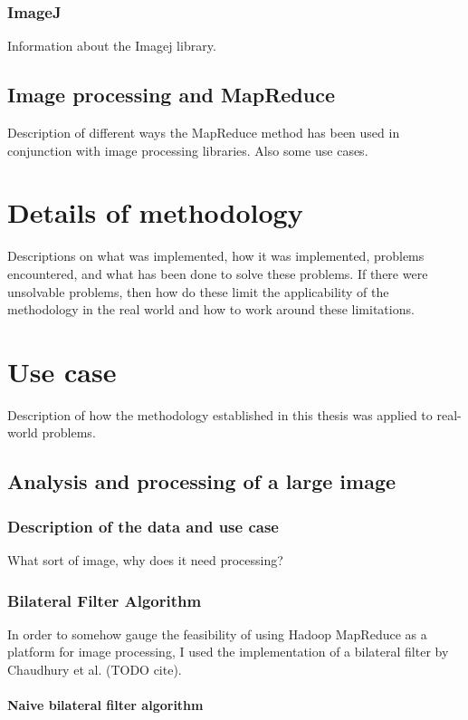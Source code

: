 \documentclass [12pt,a4paper]{report}
\begin{document}
\subsection{ImageJ}
Information about the Imagej library. 


\section{Image processing and MapReduce}
Description of different ways the MapReduce method has been used in conjunction with image processing libraries. Also some use cases.

\chapter{Details of methodology}
Descriptions on what was implemented, how it was implemented, problems encountered, and what has been done to solve these problems. If there were unsolvable problems, then how do these limit the applicability of the methodology in the real world and how to work around these limitations.

\chapter{Use case}
Description of how the methodology established in this thesis was applied to real-world problems.

\section{Analysis and processing of a large image}



\subsection{Description of the data and use case}
What sort of image, why does it need processing?



\subsection{Bilateral Filter Algorithm}

In order to somehow gauge the feasibility of using Hadoop MapReduce as a platform for image processing, I used the implementation of a bilateral filter by Chaudhury et al. (TODO cite).


\subsubsection{Naive bilateral filter algorithm}
\end{document}
